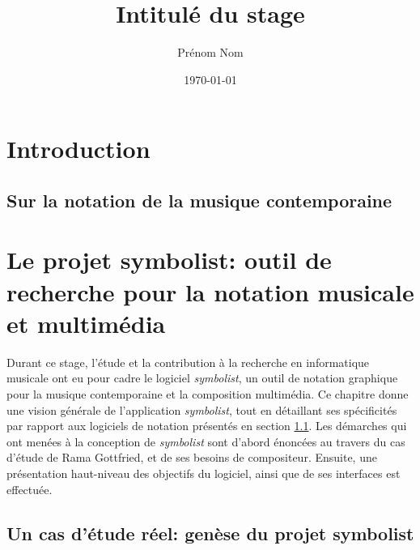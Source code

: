 \documentclass[utf8,final]{stageM2R} %
\author{Prénom Nom}
\title{Intitulé du stage}
\date{\today}
\begin{document}
   
\thispagestyle{empty} 
\frontmatter  %
\maketitle    %
\cleardoublepage   
\tableofcontents %
\mainmatter  %

\chapter{Introduction}

	\section{Sur la notation de la musique contemporaine}
	\label{sec:notationMusiqueContemporaine}
	

\chapter[Le projet symbolist]{Le projet symbolist: outil de recherche pour la notation musicale et multimédia}
\label{chap:projetSymbolist}
Durant ce stage, l'étude et la contribution à la recherche en informatique musicale ont eu pour cadre le logiciel \textit{symbolist}, un outil de notation graphique pour la musique contemporaine et la composition multimédia. Ce chapitre donne une vision générale de l'application \textit{symbolist}, tout en détaillant ses spécificités par rapport aux logiciels de notation présentés en section \ref{sec:notationMusiqueContemporaine}.
Les démarches qui ont menées à la conception de \textit{symbolist} sont d'abord énoncées au travers du cas d'étude de Rama Gottfried, et de ses besoins de compositeur. Ensuite, une présentation \og haut-niveau \fg des objectifs du logiciel, ainsi que de ses interfaces est effectuée.

	\section{Un cas d'étude réel: genèse du projet symbolist}
	\label{sec:geneseSymbolist}
		
	\newpage
	
\end{document}
